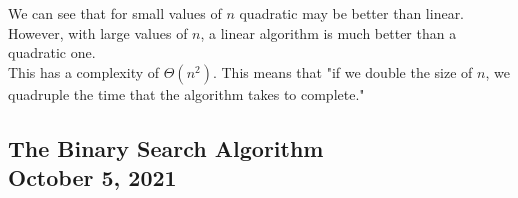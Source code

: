 \documentclass[]{article}
\begin{document}
\bigbreak
\begin{center}
\end{center}


We can see that for small values of $n$ quadratic may be better than linear. However, with large values of $n$, a linear algorithm is much better than a quadratic one.\\


This has a complexity of $\Theta(n^2)$. This means that "if we double the size of $n$, we quadruple the time that the algorithm takes to complete."\\



\subsection{The Binary Search Algorithm\\ {\normalfont October 5, 2021}}
\bigbreak
\end{document}

